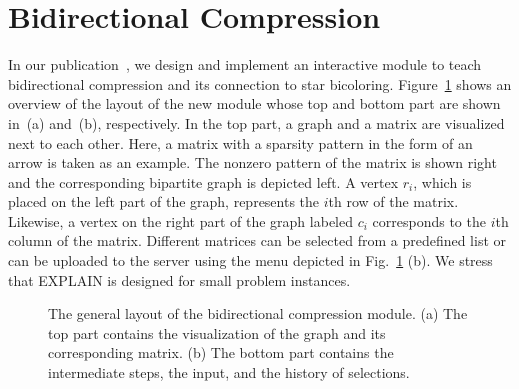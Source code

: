 \documentclass[12pt, oneside]{book}
\begin{document}
\section{Bidirectional Compression}
\label{s.bidirectional}
In our publication~\cite{2014:09}, we design and implement an interactive module to
teach bidirectional compression and its connection to star bicoloring.
Figure~\ref{f.explain} shows an overview of the layout of the new module whose top and
bottom part are shown in~(a) and~(b), respectively. In the top part, a graph and a matrix
are visualized next to each other. Here, a matrix with a sparsity pattern in the form of
an arrow is taken as an example. The nonzero pattern of the matrix is shown right and the
corresponding bipartite graph is depicted left. A vertex $r_i$, which is placed on the
left part of the graph, represents the $i$th row of the matrix. Likewise, a vertex on the
right part of the graph labeled $c_i$ corresponds to the $i$th column of the matrix.
Different matrices can be selected from a predefined list or can be uploaded to the
server using the menu depicted in Fig.~\ref{f.explain} (b). We stress that EXPLAIN is
designed for small problem instances.

\begin{figure}
  \centering
  \hfill
  \caption{The general layout of the bidirectional compression module. (a) The top part
  contains the visualization of the graph and its corresponding matrix. (b)
   The bottom part contains the intermediate steps, the input, and the
   history of selections.}
  \label{f.explain}
 \end{figure}
\end{document}
